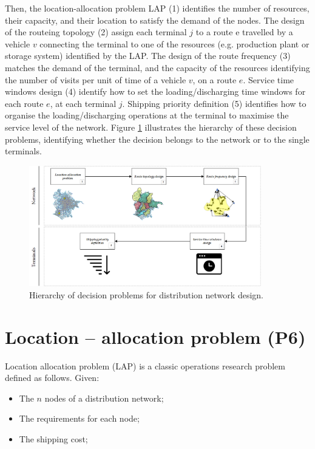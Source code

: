 Then, the location-allocation problem LAP (1) identifies the number of resources, their capacity, and their location to satisfy the demand of the nodes. The design of the routeing topology (2) assign each terminal $j$ to a route e travelled by a vehicle $v$ connecting the terminal to one of the resources (e.g. production plant or storage system) identified by the LAP. The design of the route frequency (3) matches the demand of the terminal, and the capacity of the resources identifying the number of visits per unit of time of a vehicle $v$, on a route $e$. Service time windows design (4) identify how to set the loading/discharging time windows for each route $e$, at each terminal $j$. Shipping priority definition (5) identifies how to organise the loading/discharging operations at the terminal to maximise the service level of the network. Figure \ref{fig_network_design} illustrates the hierarchy of these decision problems, identifying whether the decision belongs to the network or to the single terminals.

\begin{figure}[hbt!]
\centering
\includegraphics[width=0.9\textwidth]{SectionDistribution/design_figures/fig_network_design.png}
\captionsetup{type=figure}
\caption{Hierarchy of decision problems for distribution network design.}
\label{fig_network_design}
\end{figure}

\section{Location – allocation problem  (P6)}
Location allocation problem (LAP) is a classic operations research problem defined as follows.
Given:
\begin{itemize}
    \item The $n$ nodes of a distribution network;
	\item The requirements for each node;
	\item The shipping cost;
\end{itemize}

